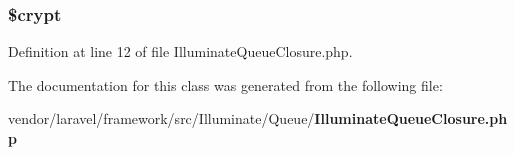 \subsubsection[{\$crypt}]{\setlength{\rightskip}{0pt plus 5cm}\$crypt\hspace{0.3cm}{\ttfamily [protected]}}\label{class_illuminate_queue_closure_a8e39f0aed68a010cf3eadd556d078abd}


Definition at line 12 of file Illuminate\+Queue\+Closure.\+php.



The documentation for this class was generated from the following file\+:\begin{DoxyCompactItemize}
\item 
vendor/laravel/framework/src/\+Illuminate/\+Queue/{\bf Illuminate\+Queue\+Closure.\+php}\end{DoxyCompactItemize}
